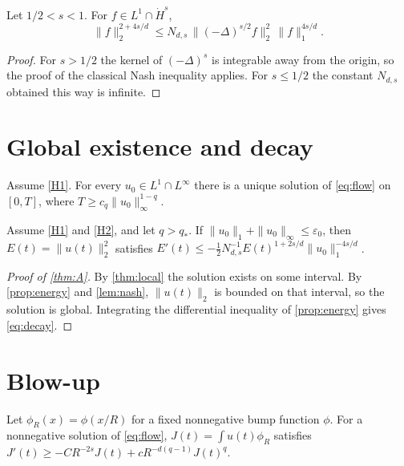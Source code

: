 \documentclass[11pt]{article}
\numberwithin{equation}{section}
\newcommand{\qc}{q_{*}}
\begin{document}
\begin{lemma}\label{lem:nash}
Let $1/2 < s < 1$. For $f \in L^1 \cap \dot H^s$,
\begin{equation}\label{eq:nash}
\|f\|_2^{2 + 4s/d} \leq N_{d,s}\, \|(-\Delta)^{s/2} f\|_2^2\, \|f\|_1^{4s/d}.
\end{equation}
\end{lemma}

\begin{proof}
For $s > 1/2$ the kernel of $(-\Delta)^{s}$ is integrable away from the origin, so the proof of the classical Nash inequality applies. For $s \leq 1/2$ the constant $N_{d,s}$ obtained this way is infinite.
\end{proof}

\section{Global existence and decay}\label{sec:global}

\begin{theorem}\label{thm:local}
Assume \eqref{H1}. For every $u_0 \in L^1 \cap L^\infty$ there is a unique solution of \eqref{eq:flow} on $[0, T]$, where $T \geq c_q \|u_0\|_\infty^{1-q}$.
\end{theorem}

\begin{proposition}\label{prop:energy}
Assume \eqref{H1} and \eqref{H2}, and let $q > \qc$. If $\|u_0\|_1 + \|u_0\|_\infty \leq \varepsilon_0$, then $E(t) = \|u(t)\|_2^2$ satisfies $E'(t) \leq -\frac{1}{2} N_{d,s}^{-1} E(t)^{1 + 2s/d} \|u_0\|_1^{-4s/d}$.
\end{proposition}

\begin{proof}[Proof of \cref{thm:A}]
By \cref{thm:local} the solution exists on some interval. By \cref{prop:energy} and \cref{lem:nash}, $\|u(t)\|_2$ is bounded on that interval, so the solution is global. Integrating the differential inequality of \cref{prop:energy} gives \eqref{eq:decay}.
\end{proof}

\section{Blow-up}\label{sec:blowup}

\begin{proposition}\label{prop:kaplan}
Let $\phi_R(x) = \phi(x/R)$ for a fixed nonnegative bump function $\phi$. For a nonnegative solution of \eqref{eq:flow}, $J(t) = \int u(t) \phi_R$ satisfies $J'(t) \geq -C R^{-2s} J(t) + c R^{-d(q-1)} J(t)^q$.
\end{proposition}
\end{document}

